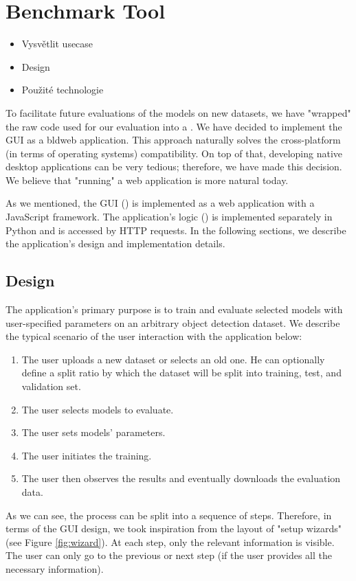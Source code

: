 \chapter{Benchmark Tool}
\begin{itemize}
    \item Vysvětlit usecase
    \item Design
    \item Použité technologie
\end{itemize}
To facilitate future evaluations of the models on new datasets, we have
"wrapped" the raw code used for our evaluation into a . We have decided to implement the GUI as a
bld{web application}. This approach naturally solves the cross-platform (in
terms of operating systems) compatibility. On top of that, developing native
desktop applications can be very tedious; therefore, we have made this decision.
We believe that "running" a web application is more natural today.

As we mentioned, the GUI () is implemented as a web application
with a JavaScript framework. The application's logic () is
implemented separately in Python and is accessed by HTTP requests. In the
following sections, we describe the application's design and implementation
details.

\section{Design}
The application's primary purpose is to train and evaluate selected models with
user-specified parameters on an arbitrary object detection dataset. We describe
the typical scenario of the user interaction with the application below:
\renewcommand{\theenumi}{\arabic{enumi}}
\begin{enumerate}
    \item The user uploads a new dataset or selects an old one. He can
          optionally define a split ratio by which the dataset will be split
          into training, test, and validation set.
    \item The user selects models to evaluate.
    \item The user sets models' parameters.
    \item The user initiates the training.
    \item The user then observes the results and eventually downloads the
          evaluation data.
\end{enumerate}
As we can see, the process can be split into a sequence of steps. Therefore, in
terms of the GUI design, we took inspiration from the layout of "setup wizards" (see Figure \ref{fig:wizard}).
At each step, only the relevant information is visible. The user can only go to
the previous or next step (if the user provides all the necessary information).

